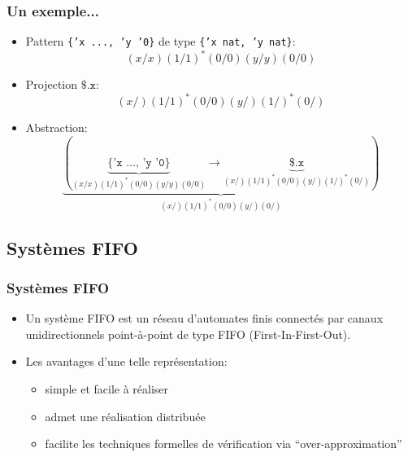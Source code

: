 \documentclass{beamer}
\newcommand{\mypause}{\pause}
\begin{document}
\begin{frame}
 \frametitle{Un exemple...}
\begin{itemize}
\item Pattern \texttt{\{'x ..., 'y '0\}} de type \texttt{\{'x nat, 'y nat\}}:
  \[(x/x)(1/1)^{\ast}(0/0)(y/y)(0/0)\] \mypause

\item Projection $\texttt{\$.x}$:
  \[(x/)(1/1)^{\ast}(0/0)(y/)(1/)^{\ast}(0/)\] \mypause

\item Abstraction:
\[
  \underbrace{(\underbrace{\{\texttt{'x ..., 'y '0}\}}_{(x/x)(1/1)^{\ast}(0/0)(y/y)(0/0)} \rightarrow 
   \underbrace{\texttt{\$.x}}_{(x/)(1/1)^{\ast}(0/0)(y/)(1/)^{\ast}(0/)})}_{(x/)(1/1)^{\ast}(0/0)(y/)(0/)}
\]
\end{itemize}
\end{frame}

\subsection{Systèmes FIFO}
\begin{frame}
  \frametitle{Systèmes FIFO}
  \begin{itemize}
  \item Un système FIFO est un réseau d'automates finis connectés par
    canaux unidirectionnels point-à-point de type FIFO
    (First-In-First-Out). \mypause

  \item Les  avantages d'une telle représentation:
    \begin{itemize}
    \item simple et facile à réaliser \mypause 
    \item admet une réalisation distribuée \mypause
    \item facilite les techniques formelles de vérification via ``over-approximation''
    \end{itemize}

  \end{itemize}
\end{frame}
\end{document}
